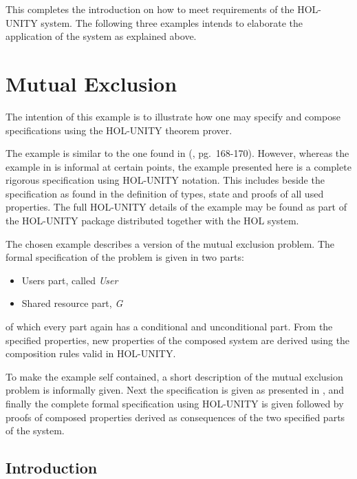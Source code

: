 \bigskip
This completes the introduction on how to meet requirements of the HOL-UNITY
system.  The following three examples intends to elaborate the application of
the system as explained above.

\section{Mutual Exclusion} \label{sec:mutexcl}

The intention of this example is to illustrate how one may specify and compose
specifications using the HOL-UNITY theorem prover.

The example is similar to the one found in (\cite{CM88}, pg.\ 168-170).
However, whereas the example in \cite{CM88} is informal at certain points, the
example presented here is a complete rigorous specification using HOL-UNITY
notation.  This includes beside the specification as found in \cite{CM88} the
definition of types, state and proofs of all used properties.  The full
HOL-UNITY details of the example may be found as part of the HOL-UNITY
package distributed together with the HOL system.

The chosen example describes a version of the mutual exclusion problem.  The
formal specification of the problem is given in two parts:
\begin{itemize}
   \item Users part, called {\it User}
   \item Shared resource part, {\it G}
\end{itemize}
of which every part again has a conditional and unconditional part.  From the 
specified properties, new properties of the composed system are derived using 
the composition rules valid in HOL-UNITY.

To make the example self contained, a short description of the mutual exclusion
problem is informally given.  Next the specification is given as presented in
\cite{CM88}, and finally the complete formal specification using HOL-UNITY is
given followed by proofs of composed properties derived as consequences of the
two specified parts of the system.

\subsection{Introduction}


